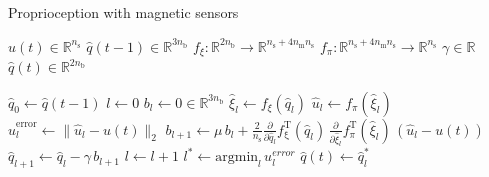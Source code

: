 \begin{algorithm}[ht!]
\caption{Proprioception with magnetic sensors}\label{alg:promasens:proprioception}
\begin{algorithmic}[1]
    \Require $u(t) \in \mathbb{R}^{n_\mathrm{s}}$ 
    \Require  $\hat{q}(t-1) \in \mathbb{R}^{3n_\mathrm{b}}$
    \Require $f_\xi: \mathbb{R}^{2n_\mathrm{b}} \rightarrow \mathbb{R}^{n_\mathrm{s} + 4n_\mathrm{m} n_\mathrm{s}}$ 
    \Require $f_\pi: \mathbb{R}^{n_\mathrm{s} + 4n_\mathrm{m} n_\mathrm{s}} \rightarrow \mathbb{R}^{n_\mathrm{s}}$ 
    \Require $\gamma \in \mathbb{R}$ 
    \Ensure $\hat{q}(t) \in \mathbb{R}^{2n_\mathrm{b}}$ 
    
    \State $\hat{q}_0 \gets \hat{q}(t-1)$
    \vspace{0.25em}
    \State $l \gets 0$
    \State $b_l \gets 0 \in \mathbb{R}^{3n_\mathrm{b}}$
    \vspace{0.25em}
        \vspace{0.25em}
        \State $\hat{\xi}_l \gets f_{\xi}(\hat{q}_{l})$
        \vspace{0.25em}
        \State $\hat{u}_l \gets f_\pi(\hat{\xi}_l)$
        \vspace{0.25em}
        \State $\hat u_{l}^{\mathrm{error}} \gets \lVert \hat{u}_{l}-u(t) \rVert_2$
        \vspace{0.25em}
        \State $b_{l+1} \gets \mu \, b_l + \frac{2}{n_\mathrm{s}} \frac{\partial }{\partial {\hat{q}_l}} f_{\mathrm{\xi}}^\mathrm{T}(\hat{q}_l) \, \frac{\partial}{\partial {\hat{\xi}_l}} f_\pi^\mathrm{T}(\hat{\xi}_l) \, (\hat{u}_l - u(t))$
        \State $\hat{q}_{l+1} \gets \hat{q}_l - \gamma \, b_{l+1} $
        \vspace{0.25em}
        \State $l \gets l + 1$
    \EndWhile
    \State $l^* \gets \mathrm{argmin}_{l} \, u_{l}^{error}$
    \State $\hat{q}(t) \gets \hat{q}_l^{*}$
\end{algorithmic}
\end{algorithm}

